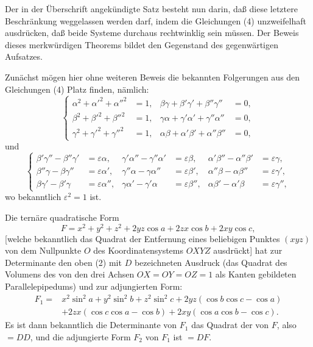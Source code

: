 \documentclass[11pt]{article}
\begin{document}
Der in der Überschrift angekündigte Satz besteht nun darin, daß diese letztere Beschränkung weggelassen werden darf, indem die Gleichungen (4) unzweifelhaft ausdrücken, daß beide Systeme durchaus rechtwinklig sein müssen. Der Beweis dieses merkwürdigen Theorems bildet den Gegenstand des gegenwärtigen Aufsatzes.

Zunächst mögen hier ohne weiteren Beweis die bekannten Folgerungen aus den Gleichungen (4) Platz finden, nämlich:
\begin{equation}
\left\{
\begin{aligned}
\alpha^2+\alpha'^2+\alpha''^2&=1, & \beta\gamma+\beta'\gamma'+\beta''\gamma''&=0,\\
\beta^2+\beta'^2+\beta''^2&=1, & \gamma\alpha+\gamma'\alpha'+\gamma''\alpha''&=0,\\
\gamma^2+\gamma'^2+\gamma''^2&=1, & \alpha\beta+\alpha'\beta'+\alpha''\beta''&=0,
\end{aligned}\right.
\tag{5}
\end{equation}
und
\begin{equation}
\left\{
\begin{aligned}
\beta'\gamma''-\beta''\gamma'&=\varepsilon\alpha, &
\gamma'\alpha''-\gamma''\alpha'&=\varepsilon\beta, &
\alpha'\beta''-\alpha''\beta'&=\varepsilon\gamma,\\
\beta''\gamma-\beta\gamma''&=\varepsilon\alpha', &
\gamma''\alpha-\gamma\alpha''&=\varepsilon\beta', &
\alpha''\beta-\alpha\beta''&=\varepsilon\gamma',\\
\beta\gamma'-\beta'\gamma&=\varepsilon\alpha'', &
\gamma\alpha'-\gamma'\alpha&=\varepsilon\beta'', &
\alpha\beta'-\alpha'\beta&=\varepsilon\gamma'',
\end{aligned}\right.
\tag{6}
\end{equation}
wo bekanntlich $\varepsilon^2=1$ ist.

Die ternäre quadratische Form
\[
F=x^2+y^2+z^2+2yz\cos a+2zx\cos b+2xy\cos c,
\]
[welche bekanntlich das Quadrat der Entfernung eines beliebigen Punktes $(xyz)$ von dem Nullpunkte $O$ des Koordinatensystems $OXYZ$ ausdrückt] hat zur Determinante den oben (2) mit $D$ bezeichneten Ausdruck (das Quadrat des Volumens des von den drei Achsen $OX=OY=OZ=1$ als Kanten gebildeten Parallelepipedums) und zur adjungierten Form:
\[
\begin{aligned}
F_1={}&x^2\sin^2a+y^2\sin^2b+z^2\sin^2c
+2yz(\cos b\cos c-\cos a)\\
&+2zx(\cos c\cos a-\cos b)+2xy(\cos a\cos b-\cos c).
\end{aligned}
\]
Es ist dann bekanntlich die Determinante von $F_1$ das Quadrat der von $F$, also $=DD$, und die adjungierte Form $F_2$ von $F_1$ ist $=DF$.
\end{document}
